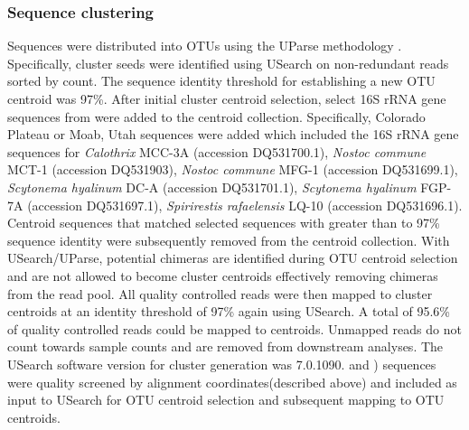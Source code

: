 \subsubsection{Sequence clustering}
Sequences were distributed into OTUs using the UParse methodology
\citep{23955772}. Specifically, cluster seeds were identified using USearch on
non-redundant reads sorted by count. The sequence
identity threshold for establishing a new OTU centroid was 97\%. After initial
cluster centroid selection, select 16S rRNA gene sequences from \citet{Yeager}
were added to the centroid collection. Specifically, \citet{Yeager} Colorado
Plateau or Moab, Utah sequences were added which included the 16S rRNA gene
sequences for \textit{Calothrix} MCC-3A (accession DQ531700.1), \textit{Nostoc
commune} MCT-1 (accession DQ531903), \textit{Nostoc commune} MFG-1 (accession
DQ531699.1), \textit{Scytonema hyalinum} DC-A (accession DQ531701.1),
\textit{Scytonema hyalinum} FGP-7A (accession DQ531697.1), \textit{Spirirestis
rafaelensis} LQ-10 (accession DQ531696.1).  Centroid sequences that matched
selected \citet{Yeager} sequences with greater than to 97\% sequence identity
were subsequently removed from the centroid collection. With USearch/UParse,
potential chimeras are identified during OTU centroid selection and are not
allowed to become cluster centroids effectively removing chimeras from the read
pool. All quality controlled reads were then mapped to cluster centroids at an
identity threshold of 97\% again using USearch. A total of 95.6\% of quality
controlled reads could be mapped to centroids. Unmapped reads do not count
towards sample counts and are removed from downstream analyses. The
USearch software version for cluster generation was 7.0.1090.
\citet{Garcia_Pichel_2013} and \citet{Steven_2013}) sequences were quality
screened by alignment coordinates(described above) and included as input to
USearch for OTU centroid selection and subsequent mapping to OTU centroids. 

